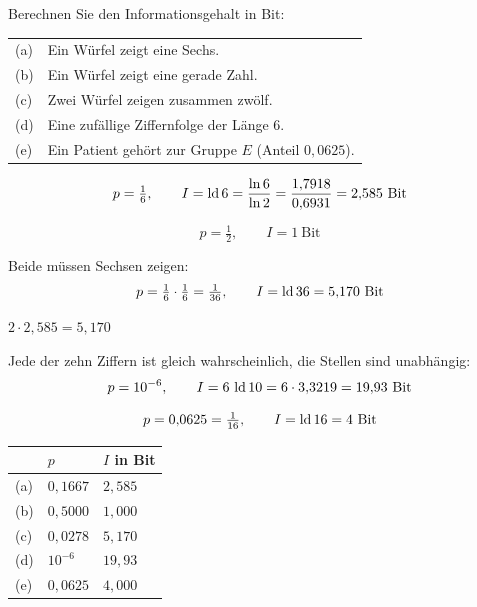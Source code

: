 \begin{aufgabe}
Berechnen Sie den Informationsgehalt in Bit:
\begin{center}
{\small
\renewcommand{\arraystretch}{1.4}
\begin{tabular}{@{}P{0.8cm}P{7.6cm}@{}}
\toprule
(a) & Ein Würfel zeigt eine Sechs.\\
(b) & Ein Würfel zeigt eine gerade Zahl.\\
(c) & Zwei Würfel zeigen zusammen zwölf.\\
(d) & Eine zufällige Ziffernfolge der Länge $6$.\\
(e) & Ein Patient gehört zur Gruppe $E$ (Anteil $0{,}0625$).\\
\bottomrule
\end{tabular}}
\end{center}

\loesung
{}
\[ p = \tfrac16, \qquad I = \lb 6 = \frac{\ln 6}{\ln 2} = \frac{1{,}7918}{0{,}6931} = 2{,}585 \ \text{Bit} \]

\[ p = \tfrac12, \qquad I = 1 \ \text{Bit} \]

Beide müssen Sechsen zeigen:
\[ p = \tfrac16\cdot\tfrac16 = \tfrac1{36}, \qquad I = \lb 36 = 5{,}170 \ \text{Bit} \]

 $2\cdot2{,}585 = 5{,}170$ \checkmark

Jede der zehn Ziffern ist gleich wahrscheinlich, die Stellen sind unabhängig:
\[ p = 10^{-6}, \qquad I = 6\,\operatorname{ld} 10 = 6\cdot3{,}3219 = 19{,}93 \ \text{Bit} \]

\begin{center}
\begin{minipage}{0.86\textwidth}
\end{minipage}
\end{center}

\[ p = 0{,}0625 = \tfrac1{16}, \qquad I = \operatorname{ld} 16 = 4 \ \text{Bit} \]

\begin{center}
\renewcommand{\arraystretch}{1.46}
\begin{tabular}{@{}P{1.0cm}P{2.2cm}P{2.4cm}@{}}
\toprule
& $p$ & $I$ in Bit\\
\midrule
(a) & $0{,}1667$ & $2{,}585$\\
(b) & $0{,}5000$ & $1{,}000$\\
(c) & $0{,}0278$ & $5{,}170$\\
(d) & $10^{-6}$ & $19{,}93$\\
(e) & $0{,}0625$ & $4{,}000$\\
\bottomrule
\end{tabular}
\end{center}


\end{aufgabe}

